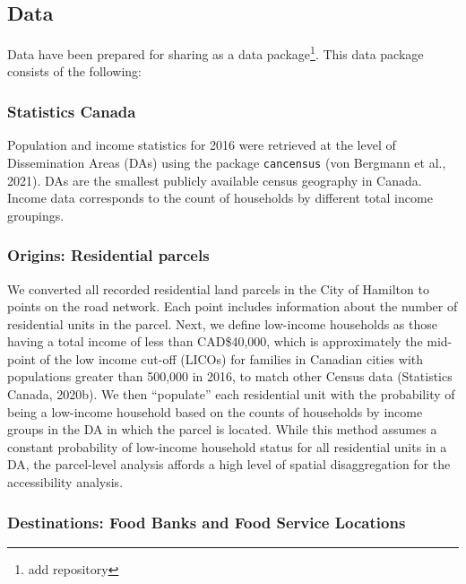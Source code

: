 \documentclass[]{elsarticle} %
\begin{document}
\hypertarget{data}{%
\subsection{Data}\label{data}}

Data have been prepared for sharing as a data package\footnote{add
  repository}. This data package consists of the following:

\hypertarget{statistics-canada}{%
\subsubsection{Statistics Canada}\label{statistics-canada}}

Population and income statistics for 2016 were retrieved at the level of
Dissemination Areas (DAs) using the package \texttt{cancensus} (von
Bergmann et al., 2021). DAs are the smallest publicly available census
geography in Canada. Income data corresponds to the count of households
by different total income groupings.

\hypertarget{origins-residential-parcels}{%
\subsubsection{Origins: Residential
parcels}\label{origins-residential-parcels}}

We converted all recorded residential land parcels in the City of
Hamilton to points on the road network. Each point includes information
about the number of residential units in the parcel. Next, we define
low-income households as those having a total income of less than
CAD\$40,000, which is approximately the mid-point of the low income
cut-off (LICOs) for families in Canadian cities with populations greater
than 500,000 in 2016, to match other Census data (Statistics Canada,
2020b). We then ``populate'' each residential unit with the probability
of being a low-income household based on the counts of households by
income groups in the DA in which the parcel is located. While this
method assumes a constant probability of low-income household status for
all residential units in a DA, the parcel-level analysis affords a high
level of spatial disaggregation for the accessibility analysis.

\hypertarget{destinations-food-banks-and-food-service-locations}{%
\subsubsection{Destinations: Food Banks and Food Service
Locations}\label{destinations-food-banks-and-food-service-locations}}
\end{document}
